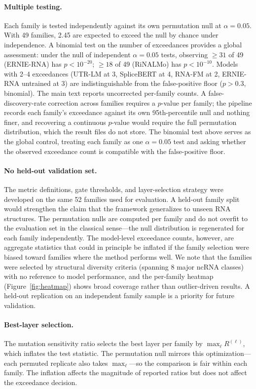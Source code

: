 \documentclass[11pt]{article}
\begin{document}
\paragraph{Multiple testing.}
Each family is tested independently against its own permutation null
at $\alpha = 0.05$. With 49 families, 2.45 are expected to exceed the
null by chance under independence. A binomial test on
the number of exceedances provides a global assessment: under the
null of independent $\alpha = 0.05$ tests, observing $\geq 31$ of 49
(ERNIE-RNA) has $p < 10^{-20}$; $\geq 18$ of 49 (RiNALMo) has
$p < 10^{-10}$. Models with 2--4 exceedances (UTR-LM at 3, SpliceBERT
at 4, RNA-FM at 2, ERNIE-RNA untrained at 3) are
indistinguishable from the false-positive floor ($p > 0.3$,
binomial). The main text reports uncorrected per-family counts. A
false-discovery-rate correction across families requires a $p$-value
per family; the pipeline records each family's exceedance against its
own 95th-percentile null and nothing finer, and recovering a
continuous $p$-value would require the full permutation distribution,
which the result files do not store. The binomial test above serves as
the global control, treating each family as one $\alpha = 0.05$ test
and asking whether the observed exceedance count is compatible with
the false-positive floor.

\paragraph{No held-out validation set.}
The metric definitions, gate thresholds, and layer-selection strategy
were developed on the same 52 families used for evaluation. A
held-out family split would strengthen the claim that the framework
generalizes to unseen RNA structures. The permutation nulls are
computed per family and do not overfit to the evaluation set in the
classical sense---the null distribution is regenerated for each
family independently. The model-level exceedance counts, however,
are aggregate statistics that could in principle be inflated if the
family selection were biased toward families where the method
performs well. We note that the families were selected by structural
diversity criteria (spanning 8 major ncRNA classes) with no reference
to model performance, and the per-family heatmap
(Figure~\ref{fig:heatmap}) shows broad coverage rather than outlier-driven
results. A held-out replication on an independent family sample is a
priority for future validation.

\paragraph{Best-layer selection.}
The mutation sensitivity ratio selects the best layer per family by
$\max_\ell R^{(\ell)}$, which inflates the test statistic. The
permutation null mirrors this optimization---each permuted replicate
also takes $\max_\ell$---so the comparison is fair within each family.
The inflation affects the magnitude of reported ratios but does not
affect the exceedance decision.
\end{document}
